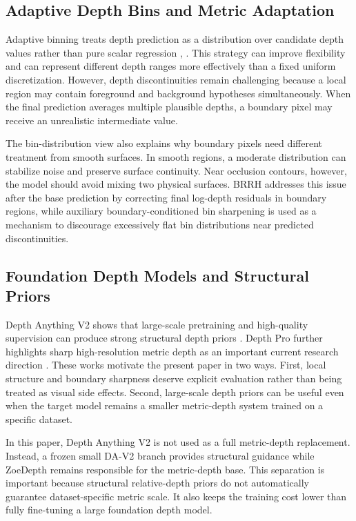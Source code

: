 \documentclass{ieeeaccess}
\begin{document}
\subsection{Adaptive Depth Bins and Metric Adaptation}

Adaptive binning treats depth prediction as a distribution over candidate depth values rather than pure scalar regression \cite{adabins}, \cite{zoedepth}. This strategy can improve flexibility and can represent different depth ranges more effectively than a fixed uniform discretization. However, depth discontinuities remain challenging because a local region may contain foreground and background hypotheses simultaneously. When the final prediction averages multiple plausible depths, a boundary pixel may receive an unrealistic intermediate value.

The bin-distribution view also explains why boundary pixels need different treatment from smooth surfaces. In smooth regions, a moderate distribution can stabilize noise and preserve surface continuity. Near occlusion contours, however, the model should avoid mixing two physical surfaces. BRRH addresses this issue after the base prediction by correcting final log-depth residuals in boundary regions, while auxiliary boundary-conditioned bin sharpening is used as a mechanism to discourage excessively flat bin distributions near predicted discontinuities.

\subsection{Foundation Depth Models and Structural Priors}

Depth Anything V2 shows that large-scale pretraining and high-quality supervision can produce strong structural depth priors \cite{dav2}. Depth Pro further highlights sharp high-resolution metric depth as an important current research direction \cite{depthpro}. These works motivate the present paper in two ways. First, local structure and boundary sharpness deserve explicit evaluation rather than being treated as visual side effects. Second, large-scale depth priors can be useful even when the target model remains a smaller metric-depth system trained on a specific dataset.

In this paper, Depth Anything V2 is not used as a full metric-depth replacement. Instead, a frozen small DA-V2 branch provides structural guidance while ZoeDepth remains responsible for the metric-depth base. This separation is important because structural relative-depth priors do not automatically guarantee dataset-specific metric scale. It also keeps the training cost lower than fully fine-tuning a large foundation depth model.
\end{document}
